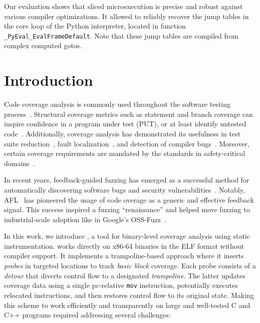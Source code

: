 Our evaluation shows that sliced microexecution is precise and robust against various compiler optimizations.
It allowed {\bcov} to reliably recover the jump tables in the core loop of the Python interpreter, located in function \texttt{\_PyEval\_EvalFrameDefault}. Note that these jump tables are compiled from complex computed gotos.


\section{Introduction}
\label{sec:introduction}

Code coverage analysis is commonly used throughout the software testing process~\cite{Ammann2016}.
Structural coverage metrics such as statement and branch coverage can inspire confidence in a program under test (PUT), or at least identify untested code~\cite{Inozemtseva2014,Gopinath2014}.
Additionally, coverage analysis has demonstrated its usefulness in test suite reduction~\cite{Yoo2010}, fault localization~\cite{Pearson2017}, and detection of compiler bugs~\cite{Le2014}.
Moreover, certain coverage requirements are mandated by the standards in safety-critical domains~\cite{DO178C,ISO26262:2018}.

In recent years, feedback-guided fuzzing has emerged as a successful method for automatically discovering software bugs and security vulnerabilities~\cite{VUzzerRawat2017,kAFL:Schumilo2017,QSYMYun2018,Bohme2016a}. 
Notably, AFL~\cite{ZalewskiAFLWhitePaper} has pioneered the usage of code overage as a generic and effective feedback signal.
This success inspired a fuzzing ``renaissance'' and helped move fuzzing to  industrial-scale adoption like in Google's \mbox{OSS-Fuzz}~\cite{OSSFUZZ}.

In this work, we introduce {\bcov}, a tool for binary-level coverage analysis using static instrumentation.
{\bcov} works directly on x86-64 binaries in the ELF format without compiler support. 
It implements a trampoline-based approach where it inserts \textit{probes} in targeted locations to track \textit{basic block} coverage. 
Each probe consists of a \textit{detour} that diverts control flow to a designated \textit{trampoline}. 
The latter updates coverage data using a single pc-relative \texttt{mov} instruction, potentially executes relocated instructions, and then restores control flow to its original state.
Making this scheme to work efficiently and transparently on large and well-tested C and C++ programs required addressing several challenges:

